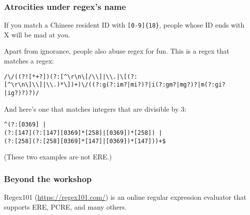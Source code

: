\begin{frame}[fragile]
\frametitle{Atrocities under regex's name}
If you match a Chinese resident ID with \verb|[0-9]{18}|, people whose
ID ends with X will be mad at you.

Apart from ignorance, people also abuse regex for fun. This is a regex
that matches a regex:
\begin{lstlisting}
/\/((?![*+?])(?:[^\r\n\[/\\]|\\.|\[(?:[^\r\n\]\\]|\\.)*\])+)\/((?:g(?:im?|mi?)?|i(?:gm?|mg?)?|m(?:gi?|ig?)?)?)/
\end{lstlisting}

And here's one that matches integers that are divisible by 3:
\begin{lstlisting}
^(?:[0369] |
(?:[147](?:[147][0369]*[258]|[0369])*[258]) |
(?:[258](?:[258][0369]*[147]|[0369])*[147]))+$
\end{lstlisting}

(These two examples are not ERE.)
\end{frame}

\begin{frame}
\frametitle{Beyond the workshop}
Regex101 (\url{https://regex101.com/}) is an online regular expression
evaluator that supports ERE, PCRE, and many others.
\end{frame}
